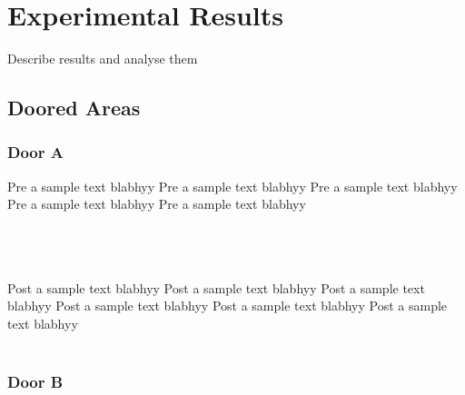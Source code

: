 
\chapter{Experimental Results}
Describe results and analyse them

\section{ Doored Areas }

\subsection { Door A }
Pre a sample text blabhyy
Pre a sample text blabhyy
Pre a sample text blabhyy
Pre a sample text blabhyy
Pre a sample text blabhyy \\ \\

\begin{table}[H!]
\centering
{}
\caption{Door A Data Overview}
\end{table}


\\ \\ Post a sample text blabhyy
Post a sample text blabhyy
Post a sample text blabhyy
Post a sample text blabhyy
Post a sample text blabhyy
Post a sample text blabhyy \\ \\

\subsection { Door B }

